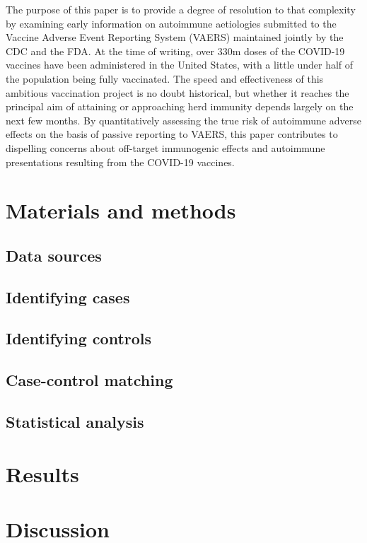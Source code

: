 \documentclass{article}
\begin{document}
The purpose of this paper is to provide a degree of resolution to that complexity by examining early information on autoimmune aetiologies submitted to the Vaccine Adverse Event Reporting System (VAERS) maintained jointly by the CDC and the FDA.
At the time of writing, over 330m doses of the COVID-19 vaccines have been administered in the United States, with a little under half of the population being fully vaccinated.
The speed and effectiveness of this ambitious vaccination project is no doubt historical, but whether it reaches the principal aim of attaining or approaching herd immunity depends largely on the next few months.
By quantitatively assessing the true risk of autoimmune adverse effects on the basis of passive reporting to VAERS, this paper contributes to dispelling concerns about off-target immunogenic effects and autoimmune presentations resulting from the COVID-19 vaccines.

\section{Materials and methods}

\subsection{Data sources}


\subsection{Identifying cases}
	
\subsection{Identifying controls}
	
\subsection{Case-control matching}
	
\subsection{Statistical analysis}
	
\section{Results}

\section{Discussion}
\end{document}
